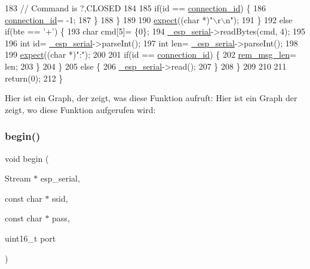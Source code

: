 \begin{DoxyCode}
183         \textcolor{comment}{// Command is ?,CLOSED}
184 
185         \textcolor{keywordflow}{if}(\textcolor{keywordtype}{id} == \hyperlink{classEspServer_a821bd4e05f0b260cc584a2d23bda0fff}{connection\_id}) \{
186           \hyperlink{classEspServer_a821bd4e05f0b260cc584a2d23bda0fff}{connection\_id}= -1;
187         \}
188       \}
189 
190       \hyperlink{classEspServer_aff5ea67ab96af075223b2b836036ccf1}{expect}((\textcolor{keywordtype}{char} *)\textcolor{stringliteral}{"\(\backslash\)r\(\backslash\)n"});
191     \}
192     \textcolor{keywordflow}{else} \textcolor{keywordflow}{if}(bte == \textcolor{charliteral}{'+'}) \{
193       \textcolor{keywordtype}{char} cmd[5]= \{0\};
194       \hyperlink{classEspServer_a552aab874ad99b696f4c997d6f5a4746}{\_esp\_serial}->readBytes(cmd, 4);
195 
196       \textcolor{keywordtype}{int} \textcolor{keywordtype}{id}= \hyperlink{classEspServer_a552aab874ad99b696f4c997d6f5a4746}{\_esp\_serial}->parseInt();
197       \textcolor{keywordtype}{int} len= \hyperlink{classEspServer_a552aab874ad99b696f4c997d6f5a4746}{\_esp\_serial}->parseInt();
198 
199       \hyperlink{classEspServer_aff5ea67ab96af075223b2b836036ccf1}{expect}((\textcolor{keywordtype}{char} *)\textcolor{stringliteral}{":"});
200 
201       \textcolor{keywordflow}{if}(\textcolor{keywordtype}{id} == \hyperlink{classEspServer_a821bd4e05f0b260cc584a2d23bda0fff}{connection\_id}) \{
202         \hyperlink{classEspServer_a34a62d83c82a13f441af983f9b212e25}{rem\_msg\_len}= len;
203       \}
204     \}
205     \textcolor{keywordflow}{else} \{
206       \hyperlink{classEspServer_a552aab874ad99b696f4c997d6f5a4746}{\_esp\_serial}->read();
207     \}
208   \}
209 
210 
211   \textcolor{keywordflow}{return}(0);
212 \}
\end{DoxyCode}
Hier ist ein Graph, der zeigt, was diese Funktion aufruft\+:
Hier ist ein Graph der zeigt, wo diese Funktion aufgerufen wird\+:
\mbox{\label{classEspServer_a1d8682ca0934af03639311e23a71283f}} 
\subsubsection{\texorpdfstring{begin()}{begin()}}
{\footnotesize\ttfamily void begin (\begin{DoxyParamCaption}\item[{Stream $\ast$}]{esp\+\_\+serial,  }\item[{const char $\ast$}]{ssid,  }\item[{const char $\ast$}]{pass,  }\item[{uint16\+\_\+t}]{port }\end{DoxyParamCaption})}



